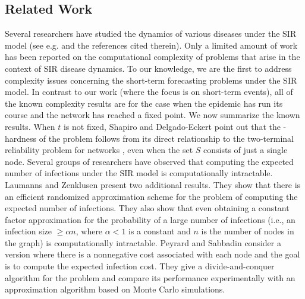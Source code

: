 \subsection{Related Work}
\label{sse:related_work}

Several researchers have studied the dynamics of various diseases
under the SIR model 
(see e.g. \cite{marathe:cacm13,Britton-2009,BB+2009,Brauer-2008,
Salathe-Jones-2010,Ferrari-etal-2006} and the references cited therein).
Only a limited amount of work has been reported on
the computational complexity of problems that arise 
in the context of SIR disease dynamics. 
To our knowledge, we are the first to address complexity issues concerning
the short-term forecasting problems under the SIR model.
In contrast to our work (where the focus
is on short-term events), all of the known complexity results are for the case
when the epidemic has run its course and the network has reached a fixed point. 
We now summarize the known results.
When $t$ is not fixed,
Shapiro and Delgado-Eckert \cite{SD-2012} point out that the 
\cnp-hardness of the \tVuls{} problem follows from its direct relationship to
the two-terminal reliability problem for networks \cite{Ball-1980,Colbourn-1987},
even when the set $S$ consists of just a single node.
Several groups of researchers \cite{SD-2012,PS-2012,LZ-2009} 
have observed that computing the expected number of infections 
under the SIR model is computationally intractable.
Laumanns and Zenklusen \cite{LZ-2009} present two additional results.
They show that there is an efficient randomized approximation scheme 
for the problem of computing the expected number of infections.
They also show that even obtaining a constant factor approximation for the 
probability of a large number of infections (i.e., an infection size 
$\geq \alpha n$, where $\alpha < 1$ is a constant and $n$ is the number
of nodes in the graph) is computationally intractable.
Peyrard and Sabbadin \cite{PS-2012} consider a version where there is a
nonnegative cost associated with each node and the goal is to compute
the expected infection cost. 
They give a divide-and-conquer algorithm for the problem and compare its
performance experimentally with an approximation algorithm based 
on Monte Carlo simulations.

